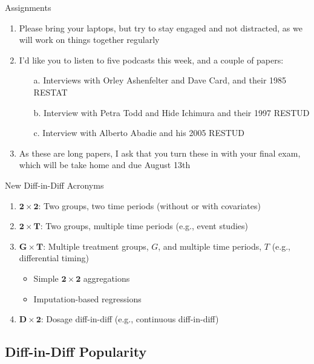 \documentclass{beamer}
\begin{document}
\begin{frame}{Assignments}

\begin{enumerate}
\item Please bring your laptops, but try to stay engaged and not distracted, as we will work on things together regularly
\item I'd like you to listen to five podcasts this week, and a couple of papers:
	\begin{enumerate}
	\item [a. ] Interviews with Orley Ashenfelter and Dave Card, and their 1985 RESTAT
	\item [b. ] Interview with Petra Todd and Hide Ichimura and their 1997 RESTUD
	\item [c. ] Interview with Alberto Abadie and his 2005 RESTUD
	\end{enumerate}
\item As these are long papers, I ask that you turn these in with your final exam, which will be take home and due August 13th
\end{enumerate}

\end{frame}



\begin{frame}{New Diff-in-Diff Acronyms}

\begin{enumerate}

\item $\mathbf{2 \times 2}$: Two groups, two time periods (without or with covariates)	
\item $\mathbf{2 \times T}$: Two groups, multiple time periods (e.g., event studies)
\item $\mathbf{G \times T}$: Multiple treatment groups, $G$, and multiple time periods, $T$ (e.g., differential timing)
	\begin{itemize}
	\item Simple $\mathbf{2 \times 2}$ aggregations
	\item Imputation-based regressions
	\end{itemize}
\item $\mathbf{D \times 2}$: Dosage diff-in-diff (e.g., continuous diff-in-diff)
\end{enumerate}

\end{frame}



\subsection{Diff-in-Diff Popularity}
\end{document}
